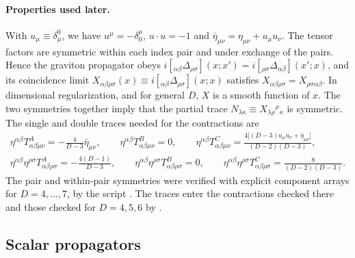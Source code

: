 \documentclass[aps,prd,onecolumn,10pt,nofootinbib,floatfix]{revtex4-2}
\begin{document}
\paragraph*{Properties used later.}
With $u_\mu\equiv\delta^0_\mu$, we have $u^\mu=-\delta^\mu_0$, $u\cdot u=-1$
and $\bar\eta_{\mu\nu}=\eta_{\mu\nu}+u_\mu u_\nu$. The tensor factors are
symmetric within each index pair and under exchange of the pairs. Hence the
graviton propagator obeys
$i[{}_{\alpha\beta}\Delta_{\rho\sigma}](x;x')=i[{}_{\rho\sigma}\Delta_{\alpha\beta}](x';x)$,
and its coincidence limit
$X_{\alpha\beta\rho\sigma}(x)\equiv i[{}_{\alpha\beta}\Delta_{\rho\sigma}](x;x)$
satisfies $X_{\alpha\beta\rho\sigma}=X_{\rho\sigma\alpha\beta}$. In
dimensional regularization, and for general $D$, $X$ is a smooth function of
$x$. The two symmetries together imply that the partial trace
$N_{\lambda\kappa}\equiv X_{\lambda\rho}{}^\rho{}_\kappa$ is symmetric. The
single and double traces needed for the contractions are
\begin{equation}
\begin{gathered}
\eta^{\alpha\beta}T^{A}_{\alpha\beta\mu\nu}=-\frac{4}{D-3}\bar\eta_{\mu\nu},\qquad
\eta^{\alpha\beta}T^{B}_{\alpha\beta\mu\nu}=0,\qquad
\eta^{\alpha\beta}T^{C}_{\alpha\beta\mu\nu}=\frac{4\big[(D-3)u_\mu u_\nu+\bar\eta_{\mu\nu}\big]}{(D-2)(D-3)},\\
\eta^{\alpha\beta}\eta^{\rho\sigma}T^{A}_{\alpha\beta\rho\sigma}=-\frac{4(D-1)}{D-3},\qquad
\eta^{\alpha\beta}\eta^{\rho\sigma}T^{B}_{\alpha\beta\rho\sigma}=0,\qquad
\eta^{\alpha\beta}\eta^{\rho\sigma}T^{C}_{\alpha\beta\rho\sigma}=\frac{8}{(D-2)(D-3)}.
\end{gathered}
\label{eq:s2:traces}
\end{equation}
The pair and within-pair symmetries were verified with explicit component
arrays for $D=4,\dots,7$, by the script
. The traces enter the
contractions checked there and those checked for $D=4,5,6$ by
.

\subsection{Scalar propagators}
\label{sec:s2:scalar}
\end{document}
